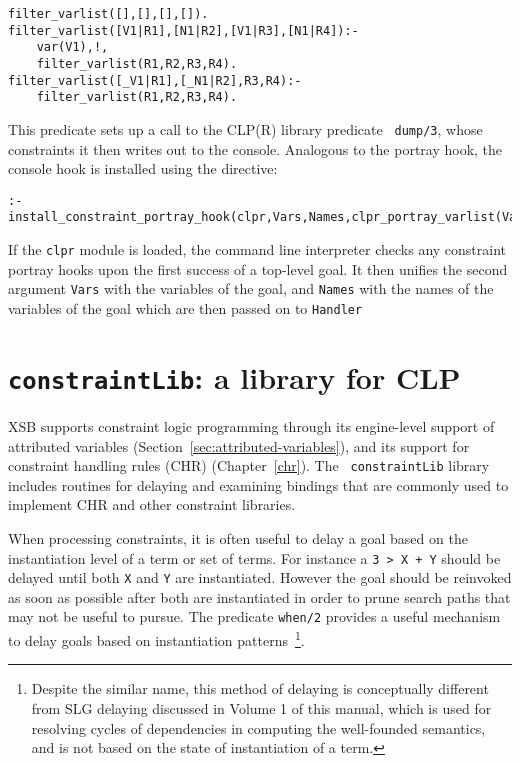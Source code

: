 \begin{description}
{\begin{verbatim}
filter_varlist([],[],[],[]).
filter_varlist([V1|R1],[N1|R2],[V1|R3],[N1|R4]):- 
	var(V1),!,
	filter_varlist(R1,R2,R3,R4).
filter_varlist([_V1|R1],[_N1|R2],R3,R4):- 
	filter_varlist(R1,R2,R3,R4).
\end{verbatim}
}
%
This predicate sets up a call to the CLP(R) library predicate {\tt
  dump/3}, whose constraints it then writes out to the console.
Analogous to the portray hook, the console hook is installed using the
directive:
%
{\small
\begin{verbatim}
:- install_constraint_portray_hook(clpr,Vars,Names,clpr_portray_varlist(Vars,Names)).
\end{verbatim}
}
%
If the {\tt clpr} module is loaded, the command line interpreter
checks any constraint portray hooks upon the first success of a
top-level goal.  It then unifies the second argument {\tt Vars} with
the variables of the goal, and {\tt Names} with the names of the
variables of the goal which are then passed on to {\tt Handler}

\end{description}

\section{{\tt constraintLib}: a library for CLP} \label{constraintLib}

XSB supports constraint logic programming through its engine-level
support of attributed variables
(Section~\ref{sec:attributed-variables}), and its support for
constraint handling rules (CHR) (Chapter~\ref{chr}).  The {\tt
constraintLib} library includes routines for delaying and examining
bindings that are commonly used to implement CHR and other constraint
libraries.

When processing constraints, it is often useful to delay a goal based
on the instantiation level of a term or set of terms.  For instance a
{\tt 3 > X + Y} should be delayed until both {\tt X} and {\tt Y} are
instantiated.  However the goal should be reinvoked as soon as
possible after both are instantiated in order to prune search paths
that may not be useful to pursue.  The predicate {\tt when/2} provides
a useful mechanism to delay goals based on instantiation
patterns~\footnote{Despite the similar name, this method of delaying
is conceptually different from SLG {\sc delaying} discussed in Volume
1 of this manual, which is used for resolving cycles of dependencies
in computing the well-founded semantics, and is not based on the state
of instantiation of a term.}.

